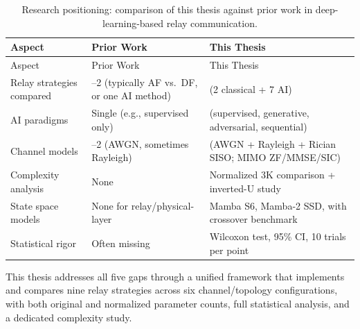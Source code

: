 \begin{longtable}[]{@{}
  >{\raggedright\arraybackslash}p{}
  >{\raggedright\arraybackslash}p{}
  >{\raggedright\arraybackslash}p{}@{}}
\caption{Research positioning: comparison of this thesis against prior work in deep-learning-based relay communication.}\label{tbl:table17}\tabularnewline
\toprule\noalign{}
\begin{minipage}[b]{\linewidth}\raggedright
Aspect
\end{minipage} & \begin{minipage}[b]{\linewidth}\raggedright
Prior Work
\end{minipage} & \begin{minipage}[b]{\linewidth}\raggedright
This Thesis
\end{minipage} \\
\midrule\noalign{}
\endfirsthead
\toprule\noalign{}
\begin{minipage}[b]{\linewidth}\raggedright
Aspect
\end{minipage} & \begin{minipage}[b]{\linewidth}\raggedright
Prior Work
\end{minipage} & \begin{minipage}[b]{\linewidth}\raggedright
This Thesis
\end{minipage} \\
\midrule\noalign{}
\endhead
\bottomrule\noalign{}
\endlastfoot
Relay strategies compared & 1--2 (typically AF vs.~DF, or one AI method) & 9 (2 classical + 7 AI) \\
AI paradigms & Single (e.g., supervised only) & 4 (supervised, generative, adversarial, sequential) \\
Channel models & 1--2 (AWGN, sometimes Rayleigh) & 6 (AWGN + Rayleigh + Rician SISO; MIMO ZF/MMSE/SIC) \\
Complexity analysis & None & Normalized 3K comparison + inverted-U study \\
State space models & None for relay/physical-layer & Mamba S6, Mamba-2 SSD, with crossover benchmark \\
Statistical rigor & Often missing & Wilcoxon test, 95\% CI, 10 trials per point \\
\end{longtable}

This thesis addresses all five gaps through a unified framework that implements and compares nine relay strategies across six channel/topology configurations, with both original and normalized parameter counts, full statistical analysis, and a dedicated complexity study.

